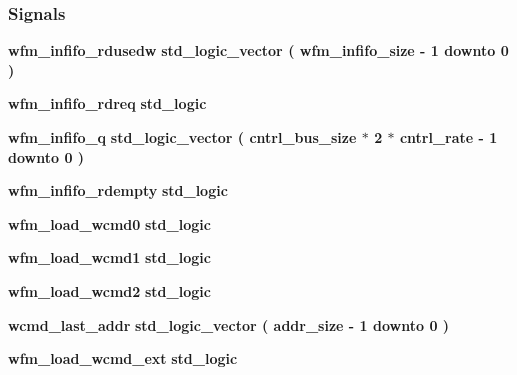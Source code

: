 \subsubsection*{Signals}
 \begin{DoxyCompactItemize}
\item 
{\bf wfm\+\_\+infifo\+\_\+rdusedw} {\bfseries \textcolor{comment}{std\+\_\+logic\+\_\+vector}\textcolor{vhdlchar}{ }\textcolor{vhdlchar}{(}\textcolor{vhdlchar}{ }\textcolor{vhdlchar}{ }\textcolor{vhdlchar}{ }\textcolor{vhdlchar}{ }{\bfseries {\bf wfm\+\_\+infifo\+\_\+size}} \textcolor{vhdlchar}{-\/}\textcolor{vhdlchar}{ } \textcolor{vhdldigit}{1} \textcolor{vhdlchar}{ }\textcolor{keywordflow}{downto}\textcolor{vhdlchar}{ }\textcolor{vhdlchar}{ } \textcolor{vhdldigit}{0} \textcolor{vhdlchar}{ }\textcolor{vhdlchar}{)}\textcolor{vhdlchar}{ }} 
\item 
{\bf wfm\+\_\+infifo\+\_\+rdreq} {\bfseries \textcolor{comment}{std\+\_\+logic}\textcolor{vhdlchar}{ }} 
\item 
{\bf wfm\+\_\+infifo\+\_\+q} {\bfseries \textcolor{comment}{std\+\_\+logic\+\_\+vector}\textcolor{vhdlchar}{ }\textcolor{vhdlchar}{(}\textcolor{vhdlchar}{ }\textcolor{vhdlchar}{ }\textcolor{vhdlchar}{ }\textcolor{vhdlchar}{ }{\bfseries {\bf cntrl\+\_\+bus\+\_\+size}} \textcolor{vhdlchar}{$\ast$}\textcolor{vhdlchar}{ } \textcolor{vhdldigit}{2} \textcolor{vhdlchar}{$\ast$}\textcolor{vhdlchar}{ }\textcolor{vhdlchar}{ }\textcolor{vhdlchar}{ }{\bfseries {\bf cntrl\+\_\+rate}} \textcolor{vhdlchar}{-\/}\textcolor{vhdlchar}{ } \textcolor{vhdldigit}{1} \textcolor{vhdlchar}{ }\textcolor{keywordflow}{downto}\textcolor{vhdlchar}{ }\textcolor{vhdlchar}{ } \textcolor{vhdldigit}{0} \textcolor{vhdlchar}{ }\textcolor{vhdlchar}{)}\textcolor{vhdlchar}{ }} 
\item 
{\bf wfm\+\_\+infifo\+\_\+rdempty} {\bfseries \textcolor{comment}{std\+\_\+logic}\textcolor{vhdlchar}{ }} 
\item 
{\bf wfm\+\_\+load\+\_\+wcmd0} {\bfseries \textcolor{comment}{std\+\_\+logic}\textcolor{vhdlchar}{ }} 
\item 
{\bf wfm\+\_\+load\+\_\+wcmd1} {\bfseries \textcolor{comment}{std\+\_\+logic}\textcolor{vhdlchar}{ }} 
\item 
{\bf wfm\+\_\+load\+\_\+wcmd2} {\bfseries \textcolor{comment}{std\+\_\+logic}\textcolor{vhdlchar}{ }} 
\item 
{\bf wcmd\+\_\+last\+\_\+addr} {\bfseries \textcolor{comment}{std\+\_\+logic\+\_\+vector}\textcolor{vhdlchar}{ }\textcolor{vhdlchar}{(}\textcolor{vhdlchar}{ }\textcolor{vhdlchar}{ }\textcolor{vhdlchar}{ }\textcolor{vhdlchar}{ }{\bfseries {\bf addr\+\_\+size}} \textcolor{vhdlchar}{-\/}\textcolor{vhdlchar}{ } \textcolor{vhdldigit}{1} \textcolor{vhdlchar}{ }\textcolor{keywordflow}{downto}\textcolor{vhdlchar}{ }\textcolor{vhdlchar}{ } \textcolor{vhdldigit}{0} \textcolor{vhdlchar}{ }\textcolor{vhdlchar}{)}\textcolor{vhdlchar}{ }} 
\item 
{\bf wfm\+\_\+load\+\_\+wcmd\+\_\+ext} {\bfseries \textcolor{comment}{std\+\_\+logic}\textcolor{vhdlchar}{ }} 
\end{DoxyCompactItemize}
